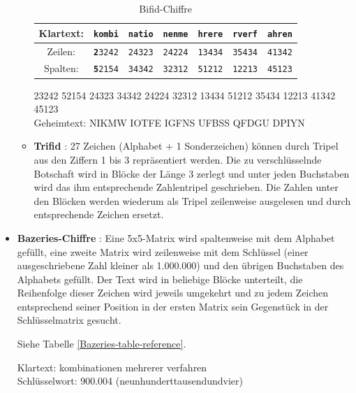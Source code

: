 \begin{refsegment}
\begin{itemize}
\begin{itemize}
\begin{table}[ht]
         \begin{center}
         \begin{tabular}{|c|cccccc|}
         \hline
         Klartext: & {\tt {\bf k}ombi} & {\tt natio} & {\tt nenme} & {\tt hrere} & {\tt rverf} & {\tt ahren}\\
         \hline
         Zeilen:	& {\tt {\bf 2}3242}	& {\tt 24323} & {\tt 24224} & {\tt 13434} & {\tt 35434} & {\tt 41342}\\
         Spalten: & {\tt {\bf 5}2154} & {\tt 34342} & {\tt 32312} & {\tt 51212} & {\tt 12213} & {\tt 45123}\\
         \hline
         \end{tabular}
         \caption{Bifid-Chiffre}
         \label{Bifid-table-reference}
         \end{center}

         \end{table}

         23242 52154 24323 34342 24224 32312 13434 51212 35434 12213 41342 45123\\

         Geheimtext: NIKMW IOTFE IGFNS UFBSS QFDGU DPIYN\\		


      \item {\bf Trifid} \cite{Savard1999}:
         27 Zeichen (Alphabet + 1 Sonderzeichen) können durch Tripel aus den
         Ziffern 1 bis 3 repräsentiert werden. Die zu verschlüsselnde
         Botschaft wird in Blöcke der Länge 3 zerlegt und unter jeden
         Buchstaben wird das ihm entsprechende Zahlentripel geschrieben. Die
         Zahlen unter den Blöcken werden wiederum als Tripel zeilenweise
         ausgelesen und durch entsprechende Zeichen ersetzt.
   \end{itemize}


\item {\bf Bazeries-Chiffre} \cite{ACA2002}:
   Eine 5x5-Matrix wird spaltenweise mit dem Alphabet gefüllt, eine zweite
   Matrix wird zeilenweise mit dem Schlüssel (einer ausgeschriebene Zahl
   kleiner als 1.000.000) und den übrigen Buchstaben des Alphabets gefüllt. Der
   Text wird in beliebige Blöcke unterteilt, die Reihenfolge dieser Zeichen
   wird jeweils umgekehrt und zu jedem Zeichen entsprechend seiner Position
   in der ersten Matrix sein Gegenstück in der Schlüsselmatrix gesucht.

   Siehe Tabelle \ref{Bazeries-table-reference}.

   Klartext: kombinationen mehrerer verfahren\\
   Schlüsselwort: 900.004 (neunhunderttausendundvier)


\end{itemize}
\end{refsegment}
